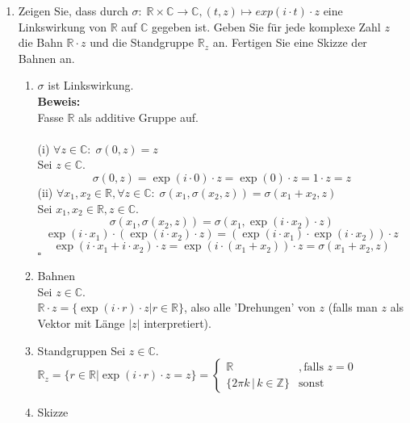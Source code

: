 \documentclass[11pt,a4paper,ngerman]{article}
\newcommand{\Z}{\mathbb{Z}}
\newcommand{\C}{\mathbb{C}}
\newcommand{\R}{\mathbb{R}}
\begin{document}
\begin{enumerate}[\bfseries a)]
\begin{enumerate}[\bfseries (1)]
\end{enumerate}

\item Zeigen Sie, dass durch $\sigma:\;\R \times \C \to \C, (t, z) \mapsto exp(i \cdot t) \cdot z$
eine Linkswirkung von $\R$ auf $\C$ gegeben ist. Geben Sie für jede komplexe Zahl $z$ die
Bahn $\R \cdot z$ und die Standgruppe $\R_z$ an. Fertigen Sie eine Skizze der Bahnen an.
\begin{enumerate}[\bfseries (1)]
\item $\sigma$ ist Linkswirkung. \\
\textbf{Beweis:}\\
Fasse $\R$ als additive Gruppe auf. \\ \\
(i) $\forall z \in \C:\; \sigma(0,z) = z$ \\
Sei $z \in \C$.
$$ \sigma(0,z) = \exp(i \cdot 0) \cdot z = \exp(0) \cdot z = 1 \cdot z = z $$
(ii) $\forall x_1, x_2 \in \R, \forall z \in \C: \; \sigma(x_1, \sigma(x_2,z)) = \sigma (x_1 + x_2, z)$ \\
Sei $ x_1, x_2 \in \R, z \in \C$.
$$ \sigma(x_1, \sigma(x_2,z)) = \sigma(x_1, \exp(i\cdot x_2) \cdot z) $$
$$ \exp(i \cdot x_1) \cdot (\exp(i \cdot x_2) \cdot z) = (\exp(i \cdot x_1) \cdot \exp(i \cdot x_2)) \cdot z $$
$$ \exp(i\cdot x_1 + i \cdot x_2) \cdot z = \exp(i \cdot (x_1 + x_2)) \cdot z = \sigma(x_1+x_2,z)$$
\mbox{} \hfill $\square$\\
\newpage
\item Bahnen \\
Sei $z \in \C$. \\
$ \R \cdot z = \{ \exp(i \cdot r) \cdot z | r \in \R \}$, also alle 'Drehungen' von $z$ (falls man $z$ als Vektor mit Länge $|z|$ interpretiert).
\item Standgruppen
Sei $z \in \C$. \\
$\R_z = \{r \in \R | \exp(i \cdot r) \cdot z = z \} = \left\{
\begin{array}{cc}
\R &, \text{falls } z = 0 \\
\{2 \pi k\,|\,k \in \Z\} & \text{sonst}
\end{array}
 \right.$
\item Skizze
\vspace{7cm}
\end{enumerate}
\end{enumerate}



\end{document}
